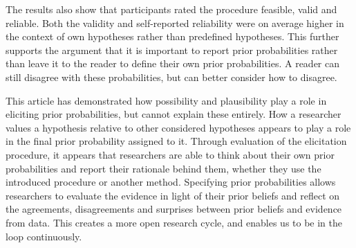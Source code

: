 \documentclass[man]{apa6}
\begin{document}
The results also show that participants rated the procedure feasible, valid and reliable.
Both the validity and self-reported reliability were on average higher in the context of own hypotheses rather than predefined hypotheses.
This further supports the argument that it is important to report prior probabilities rather than leave it to the reader to define their own prior probabilities.
A reader can still disagree with these probabilities, but can better consider how to disagree.

This article has demonstrated how possibility and plausibility play a role in eliciting prior probabilities, but cannot explain these entirely.
How a researcher values a hypothesis relative to other considered hypotheses appears to play a role in the final prior probability assigned to it.
Through evaluation of the elicitation procedure, it appears that researchers are able to think about their own prior probabilities and report their rationale behind them, whether they use the introduced procedure or another method.
Specifying prior probabilities allows researchers to evaluate the evidence in light of their prior beliefs and reflect on the agreements, disagreements and surprises between prior beliefs and evidence from data.
This creates a more open research cycle, and enables us to be in the loop continuously.

 \clearpage
 \newpage
 
 	
\end{document}
